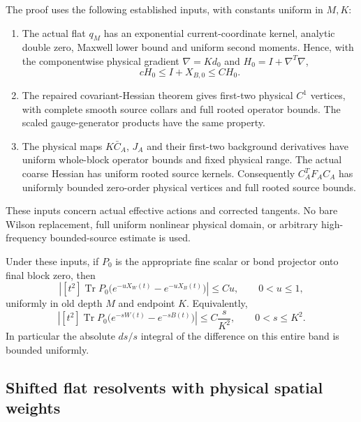 The proof uses the following established inputs, with constants
uniform in $M,K$:

\begin{enumerate}
\item The actual flat $q_M$ has an exponential current-coordinate
kernel, analytic double zero, Maxwell lower bound and uniform second
moments. Hence, with the componentwise physical gradient
$\nabla=K d_0$ and $H_0=I+\nabla^T\nabla$,
\begin{equation}
 cH_0\le I+X_{B,0}\le CH_0.
 \label{spb-base-energy}
\end{equation}
\item The repaired covariant-Hessian theorem gives first-two physical
$C^1$ vertices, with complete smooth source collars and full rooted
operator bounds. The scaled gauge-generator products have the same
property.
\item The physical maps $K\bar C_A$, $J_A$ and their first-two
background derivatives have uniform whole-block operator bounds and
fixed physical range. The actual coarse Hessian has uniform rooted
source kernels. Consequently $C_A^TF_AC_A$ has uniformly bounded
zero-order physical vertices and full rooted source bounds.
\end{enumerate}
These inputs concern actual effective actions and corrected tangents.
No bare Wilson replacement, full uniform nonlinear physical domain,
or arbitrary high-frequency bounded-source estimate is used.

\begin{theorem}
\label{spb-main}
Under these inputs, if $P_0$ is the appropriate fine scalar or bond
projector onto final block zero, then
\begin{equation}
 \left|[t^2]\operatorname{Tr}
 P_0\bigl(e^{-uX_W(t)}-e^{-uX_B(t)}\bigr)\right|
       \le Cu,\qquad 0<u\le1,
 \label{spb-physical-bound}
\end{equation}
uniformly in old depth $M$ and endpoint $K$. Equivalently,
\begin{equation}
 \left|[t^2]\operatorname{Tr}
 P_0\bigl(e^{-sW(t)}-e^{-sB(t)}\bigr)\right|
       \le C\frac{s}{K^2},\qquad 0<s\le K^2.
 \label{spb-fine-bound}
\end{equation}
In particular the absolute $ds/s$ integral of the difference on this
entire band is bounded uniformly.
\end{theorem}

\subsection{Shifted flat resolvents with physical spatial weights}
\label{spb-resolvents}

